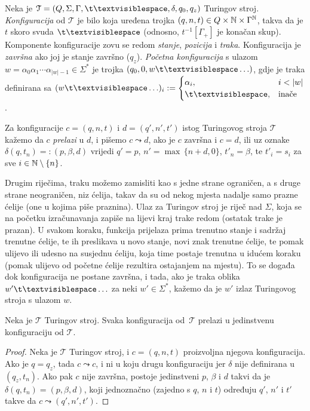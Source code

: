 \begin{definicija}
Neka je $\mathcal T=(Q,\Sigma,\Gamma,\bl,\delta,q_0,q_z)$ Turingov stroj. \emph{Konfiguracija} od $\mathcal T$ je bilo koja uređena trojka $(q,n,t)\in Q\times{\mathbb N}\times\Gamma^{\mathbb N}$, takva da je $t$ skoro svuda $\bl$ (odnosno, $t^{-1}[\Gamma_+]$ je konačan skup). Komponente konfiguracije zovu se redom \emph{stanje}, \emph{pozicija} i \emph{traka}. Konfiguracija je \emph{završna} ako joj je stanje završno ($q_z$). \emph{Početna konfiguracija} s ulazom $w=\alpha_0\alpha_1\dotsm\alpha_{\left|w\right|-1}\in\Sigma^*$ je trojka $(q_0,0,w\bl\ldots)$, gdje je traka definirana sa $(w\bl\ldots)_i:=\begin{cases}
\alpha_i,&i<\left|w\right|\\
\bl,&\text{inače}
\end{cases}$.

Za konfiguracije $c=(q,n,t)$ i $d=(q',n',t')$ istog Turingovog stroja $\mathcal T$ kažemo da $c$ \emph{prelazi} u $d$, i pišemo $c\leadsto d$, ako je $c$ završna i $c=d$, ili uz oznake $\delta(q,t_n)=:(p,\beta,d)$ vrijedi $q'=p$, $n'=\max\,\{n+d,0\}$, $t'_n=\beta$, te $t'_i=s_i$ za sve $i\in{\mathbb N}\setminus\{n\}$.
\end{definicija}

Drugim riječima, traku možemo zamisliti kao s jedne strane ograničen, a s druge strane neograničen, niz ćelija, takav da su od nekog mjesta nadalje samo prazne ćelije (one u kojima piše praznina). Ulaz za Turingov stroj je riječ nad $\Sigma$, koja se na početku izračunavanja zapiše na lijevi kraj trake redom (ostatak trake je prazan). U svakom koraku, funkcija prijelaza prima trenutno stanje i sadržaj trenutne ćelije, te ih preslikava u novo stanje, novi znak trenutne ćelije, te pomak ulijevo ili udesno na susjednu ćeliju, koja time postaje trenutna u idućem koraku (pomak ulijevo od početne ćelije rezultira ostajanjem na mjestu). To se događa dok konfiguracija ne postane završna, i tada, ako je traka oblika $w'\bl\ldots$ za neki $w'\in\Sigma^*$, kažemo da je $w'$ izlaz Turingovog stroja s ulazom $w$.

\begin{lema}\label{lm:Turingdet}
Neka je $\mathcal T$ Turingov stroj. Svaka konfiguracija od \,$\mathcal T$ prelazi u jedinstvenu konfiguraciju od $\mathcal T$.
\end{lema}
\begin{proof}
Neka je $\mathcal T$ Turingov stroj, i $c=(q,n,t)$ proizvoljna njegova konfiguracija. Ako je $q=q_z$, tada $c\leadsto c$, i ni u koju drugu konfiguraciju jer $\delta$ nije definirana u $(q_z,t_n)$. Ako pak $c$ nije završna, postoje jedinstveni $p$, $\beta$ i $d$ takvi da je $\delta(q,t_n)=(p,\beta,d)$, koji jednoznačno (zajedno s $q$, $n$ i $t$) određuju $q'$, $n'$ i $t'$ takve da $c\leadsto(q',n',t')$.
\end{proof}

